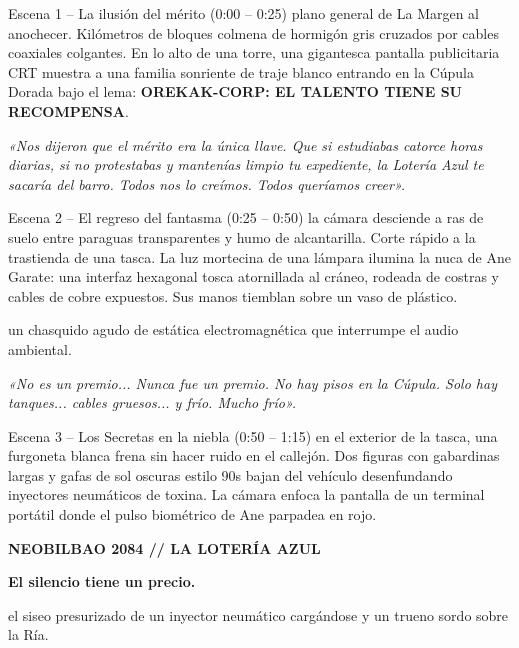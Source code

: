 \begin{CajaCinematica}{Escena 1 -- La ilusión del mérito (0:00 -- 0:25)}
 plano general de La Margen al anochecer. Kilómetros de bloques colmena de hormigón gris cruzados por cables coaxiales colgantes. En lo alto de una torre, una gigantesca pantalla publicitaria CRT muestra a una familia sonriente de traje blanco entrando en la Cúpula Dorada bajo el lema: \textbf{OREKAK-CORP: EL TALENTO TIENE SU RECOMPENSA}.\par
{}\par
\textit{«Nos dijeron que el mérito era la única llave. Que si estudiabas catorce horas diarias, si no protestabas y mantenías limpio tu expediente, la Lotería Azul te sacaría del barro. Todos nos lo creímos. Todos queríamos creer».}
\end{CajaCinematica}

\begin{CajaCinematica}{Escena 2 -- El regreso del fantasma (0:25 -- 0:50)}
 la cámara desciende a ras de suelo entre paraguas transparentes y humo de alcantarilla. Corte rápido a la trastienda de una tasca. La luz mortecina de una lámpara ilumina la nuca de Ane Garate: una interfaz hexagonal tosca atornillada al cráneo, rodeada de costras y cables de cobre expuestos. Sus manos tiemblan sobre un vaso de plástico.\par
{} un chasquido agudo de estática electromagnética que interrumpe el audio ambiental.\par
{}\par
\textit{«No es un premio... Nunca fue un premio. No hay pisos en la Cúpula. Solo hay tanques... cables gruesos... y frío. Mucho frío».}
\end{CajaCinematica}

\begin{CajaCinematica}{Escena 3 -- Los Secretas en la niebla (0:50 -- 1:15)}
 en el exterior de la tasca, una furgoneta blanca frena sin hacer ruido en el callejón. Dos figuras con gabardinas largas y gafas de sol oscuras estilo 90s bajan del vehículo desenfundando inyectores neumáticos de toxina. La cámara enfoca la pantalla de un terminal portátil donde el pulso biométrico de Ane parpadea en rojo.\par
{}\par
\textbf{NEOBILBAO 2084 // LA LOTERÍA AZUL}\par
\textbf{El silencio tiene un precio.}\par
{} el siseo presurizado de un inyector neumático cargándose y un trueno sordo sobre la Ría.
\end{CajaCinematica}
